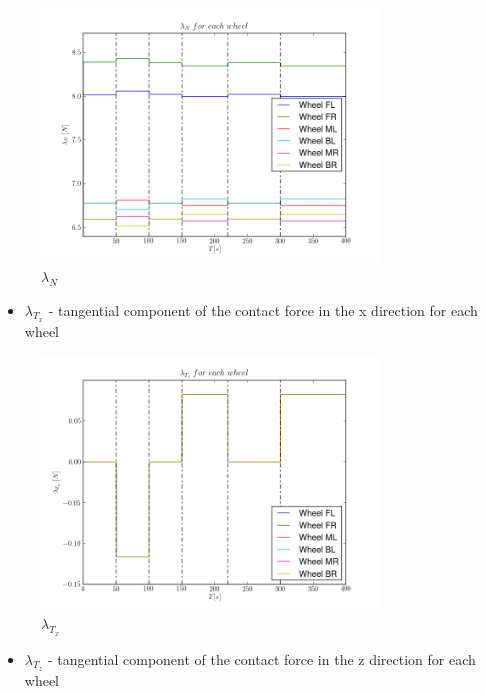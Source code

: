 \begin{figure}[H]
  \centering
    \includegraphics[width=0.8\textwidth]{lambdaN3}
  \caption{$\lambda_N$}
\end{figure}

\begin{itemize}
  \item $\lambda_{T_x}$ - tangential component of the contact force in the x direction for each wheel
\end{itemize}

\begin{figure}[H]
  \centering
    \includegraphics[width=0.8\textwidth]{lambdaTx3}
  \caption{$\lambda_{T_x}$}
\end{figure}

\begin{itemize}
  \item $\lambda_{T_z}$ - tangential component of the contact force in the z direction for each wheel
\end{itemize}

